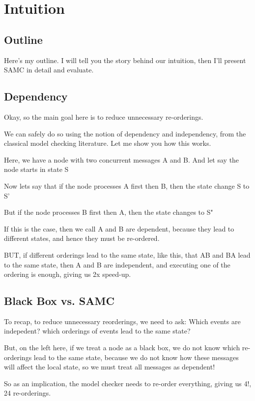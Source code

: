 \section{Intuition}

\subsection{Outline}

Here's my outline. I will tell you the story behind our intuition, then I'll
present SAMC in detail and evaluate.

\subsection{Dependency}

Okay, so the main goal here is to reduce unnecessary re-orderings.

We can safely do so using the notion of dependency and independency, from the
classical model checking literature. Let me show you how this works.

Here, we have a node with two concurrent messages A and B. And let say the node
starts in state S

Now lets say that if the node processes A first then B, then the state change S
to S'

But if the node processes B first then A, then the state changes to S"

If this is the case, then we call A and B are dependent, because they lead to
different states, and hence they must be re-ordered.

BUT, if different orderings lead to the same state, like this, that AB and BA
lead to the same state, then A and B are independent, and executing one of the
ordering is enough, giving us 2x speed-up.

\subsection{Black Box vs. SAMC}

To recap, to reduce unnecessary reorderings, we need to ask: Which events are
indepedent? which orderings of events lead to the same state?

But, on the left here, if we treat a node as a black box, we do not know which
re-orderings lead to the same state, because we do not know how these messages
will affect the local state, so we must treat all messages as dependent!

So as an implication, the model checker needs to re-order everything, giving us
4!, 24 re-orderings.


